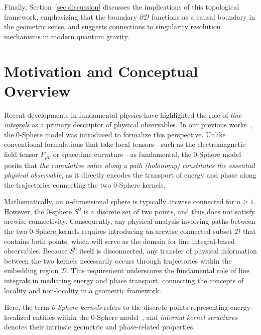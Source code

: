 \documentclass[%
 reprint,
 amsmath,amssymb,
 aps,
 prb,
]{revtex4-2}
\numberwithin{equation}{section}
\begin{document}
Finally, Section~\ref{sec:discussion} discusses the implications of this topological framework, emphasizing that the boundary $\partial\mathcal{D}$ functions as a causal boundary in the geometric sense, and suggests connections to singularity resolution mechanisms in modern quantum gravity.


\section{Motivation and Conceptual Overview}
\label{sec:motivation}

Recent developments in fundamental physics have highlighted the role of \emph{line integrals} as a primary descriptor of physical observables. 
In our previous works~\cite{hanamura18067760,hanamura18135855,hanamura18203433}, the 0-Sphere model was introduced to formalize this perspective. 
Unlike conventional formulations that take local tensors—such as the electromagnetic field tensor $F_{\mu\nu}$ or spacetime curvature—as fundamental, the 0-Sphere model posits that \emph{the cumulative value along a path (holonomy) constitutes the essential physical observable}, as it directly encodes the transport of energy and phase along the trajectories connecting the two 0-Sphere kernels.

Mathematically, an $n$-dimensional sphere is typically arcwise connected for $n \ge 1$. 
However, the 0-sphere $S^0$ is a discrete set of two points, and thus does not satisfy arcwise connectivity. 
Consequently, any physical analysis involving paths between the two 0-Sphere kernels requires introducing an arcwise connected subset $\mathcal{D}$ that contains both points, which will serve as the domain for line integral-based observables. 
Because $S^0$ itself is disconnected, any transfer of physical information between the two kernels necessarily occurs through trajectories within the embedding region $\mathcal{D}$. 
This requirement underscores the fundamental role of line integrals in mediating energy and phase transport, connecting the concepts of locality and non-locality in a geometric framework.

Here, the term \emph{0-Sphere kernels} refers to the discrete points representing energy-localized entities within the 0-Sphere model~\cite{hanamura18067760}, and \emph{internal kernel structures} denotes their intrinsic geometric and phase-related properties.
\end{document}
